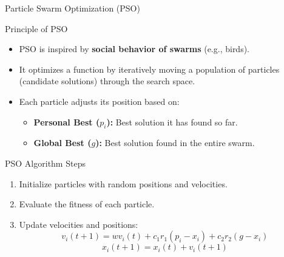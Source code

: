 \documentclass{beamer}
\begin{document}
\begin{frame}{Particle Swarm Optimization (PSO)}
    \begin{block}{Principle of PSO}
        \begin{itemize}
            \item PSO is inspired by \textbf{social behavior of swarms} (e.g., birds).
            \item It optimizes a function by iteratively moving a population of particles (candidate solutions) through the search space.
            \item Each particle adjusts its position based on:
            \begin{itemize}
                \item \textbf{Personal Best (\(p_i\)):} Best solution it has found so far.
                \item \textbf{Global Best (\(g\)):} Best solution found in the entire swarm.
            \end{itemize}
        \end{itemize}
    \end{block}
    \begin{block}{PSO Algorithm Steps}
        \begin{enumerate}
            \item Initialize particles with random positions and velocities.
            \item Evaluate the fitness of each particle.
            \item Update velocities and positions:
            \[
            v_{i}(t+1) = w v_{i}(t) + c_1 r_1 (p_i - x_i) + c_2 r_2 (g - x_i)
            \]
            \[
            x_{i}(t+1) = x_{i}(t) + v_{i}(t+1)
            \]
        \end{enumerate}
    \end{block}
\end{frame}
\end{document}
